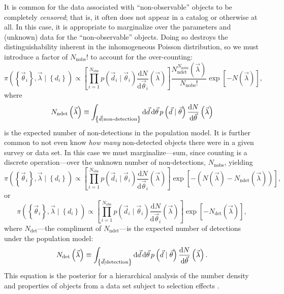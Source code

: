 \documentclass[modern]{aastex62}
\newcommand{\dd}{\mathrm{d}}
\newcommand{\diff}[2]{\frac{\dd #1}{\dd #2}}
\newcommand{\Ndet}{N_\mathrm{det}}
\newcommand{\Nndet}{N_\mathrm{ndet}}
\newcommand{\Nnobs}{N_\mathrm{nobs}}
\newcommand{\Nobs}{N_\mathrm{obs}}
\newcommand{\vd}{\vec{d}}
\newcommand{\vlambda}{\vec{\lambda}}
\newcommand{\vtheta}{\vec{\theta}}
\begin{document}
It is common for the data associated with ``non-observable'' objects to be
completely \emph{censored}; that is, it often does not appear in a catalog or
otherwise at all.  In this case, it is appropriate to marginalize over the
parameters and (unknown) data for the ``non-observable'' objects.  Doing so
destroys the distinguishability inherent in the inhomogeneous Poisson
distribution, so we must introduce a factor of $\Nnobs!$ to account for the
over-counting:
%
\begin{equation}
  \pi\left(\left\{ \vtheta_i \right\}, \vlambda \mid \left\{ d_i \right\}\right) \propto \left[ \prod_{i=1}^{\Nobs} p\left( \vd_i \mid \vtheta_i \right) \diff{N}{\vtheta_i}\left( \vlambda \right) \right] \frac{\Nndet^{\Nnobs}\left( \vlambda \right)}{\Nnobs!} \exp\left[ - N\left( \vlambda \right) \right],
\end{equation}
%
where
%
\begin{equation}
\Nndet\left( \vlambda \right) \equiv \int_{\left\{ \vd \mid \textnormal{non-detection} \right\}} \dd \vd \, \dd \vtheta \, p\left( \vd \mid \vtheta \right) \diff{N}{\vtheta}\left( \vlambda \right)
\end{equation}
%
is the expected number of non-detections in the population model.  It is further
common to not even know \emph{how many} non-detected objects there were in a
given survey or data set.  In this case we must marginalize---sum, since
counting is a discrete operation---over the unknown number of non-detections,
$\Nnobs$, yielding
%
\begin{equation}
\pi\left(\left\{ \vtheta_i \right\}, \vlambda \mid \left\{ d_i \right\}\right) \propto \left[ \prod_{i=1}^{\Nobs} p\left( \vd_i \mid \vtheta_i \right) \diff{N}{\vtheta_i}\left( \vlambda \right) \right] \exp\left[ - \left( N\left( \vlambda \right) - \Nndet\left( \vlambda \right) \right) \right],
\end{equation}
%
or
%
\begin{equation}
  \pi\left(\left\{ \vtheta_i \right\}, \vlambda \mid \left\{ d_i \right\}\right) \propto \left[ \prod_{i=1}^{\Nobs} p\left( \vd_i \mid \vtheta_i \right) \diff{N}{\vtheta_i}\left( \vlambda \right) \right] \exp\left[ - \Ndet\left( \vlambda \right) \right],
\end{equation}
%
where $\Ndet$---the compliment of $\Nndet$---is the expected number of
detections under the population model:
%
\begin{equation}
  \Ndet\left( \vlambda \right) \equiv \int_{\left\{ \vd \mid \textnormal{detection} \right\}} \dd \vd \, \dd \vtheta \, p\left( \vd \mid \vtheta \right) \diff{N}{\vtheta}\left( \vlambda \right).
\end{equation}
%
This equation is the posterior for a hierarchical analysis of the number density
and properties of objects from a data set subject to selection effects
\citep[e.g.][]{Gair2010,Youdin2011,Fishbach2018,Wysocki2018}.
\end{document}
